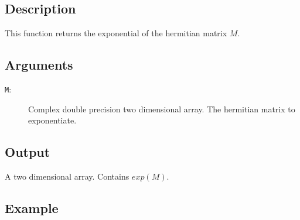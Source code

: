 \subsection{Description}

This function returns the exponential of the hermitian matrix $M$.

\subsection{Arguments}

\begin{description}
\item[\texttt{M}:]  Complex double precision two dimensional array. The
  hermitian matrix to exponentiate.
\end{description}

\subsection{Output}

A two dimensional array. Contains $exp(M)$.

\subsection{Example}

